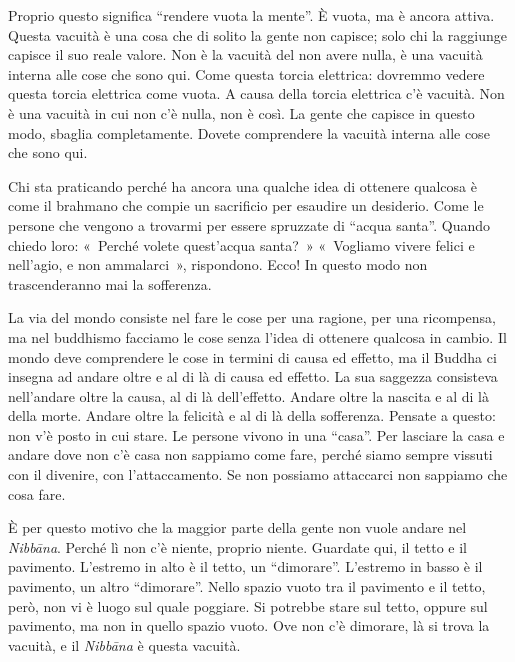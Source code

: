 Proprio questo significa ``rendere vuota la mente''. È vuota, ma è
ancora attiva. Questa vacuità è una cosa che di solito la gente non
capisce; solo chi la raggiunge capisce il suo reale valore. Non è la
vacuità del non avere nulla, è una vacuità interna alle cose che sono
qui. Come questa torcia elettrica: dovremmo vedere questa torcia
elettrica come vuota. A causa della torcia elettrica c'è vacuità. Non è
una vacuità in cui non c'è nulla, non è così. La gente che capisce in
questo modo, sbaglia completamente. Dovete comprendere la vacuità
interna alle cose che sono qui.

Chi sta praticando perché ha ancora una qualche idea di ottenere
qualcosa è come il brahmano che compie un sacrificio per esaudire un
desiderio. Come le persone che vengono a trovarmi per essere spruzzate
di ``acqua santa''. Quando chiedo loro: «~Perché volete quest'acqua
santa?~» «~Vogliamo vivere felici e nell'agio, e non ammalarci~»,
rispondono. Ecco! In questo modo non trascenderanno mai la sofferenza.

La via del mondo consiste nel fare le cose per una ragione, per una
ricompensa, ma nel buddhismo facciamo le cose senza l'idea di ottenere
qualcosa in cambio. Il mondo deve comprendere le cose in termini di
causa ed effetto, ma il Buddha ci insegna ad andare oltre e al di là di
causa ed effetto. La sua saggezza consisteva nell'andare oltre la causa,
al di là dell'effetto. Andare oltre la nascita e al di là della morte.
Andare oltre la felicità e al di là della sofferenza. Pensate a questo:
non v'è posto in cui stare. Le persone vivono in una ``casa''. Per
lasciare la casa e andare dove non c'è casa non sappiamo come fare,
perché siamo sempre vissuti con il divenire, con l'attaccamento. Se non
possiamo attaccarci non sappiamo che cosa fare.

È per questo motivo che la maggior parte della gente non vuole andare
nel \emph{Nibbāna}. Perché lì non c'è niente, proprio niente. Guardate
qui, il tetto e il pavimento. L'estremo in alto è il tetto, un
``dimorare''. L'estremo in basso è il pavimento, un altro ``dimorare''.
Nello spazio vuoto tra il pavimento e il tetto, però, non vi è luogo sul
quale poggiare. Si potrebbe stare sul tetto, oppure sul pavimento, ma
non in quello spazio vuoto. Ove non c'è dimorare, là si trova la
vacuità, e il \emph{Nibbāna} è questa vacuità.

